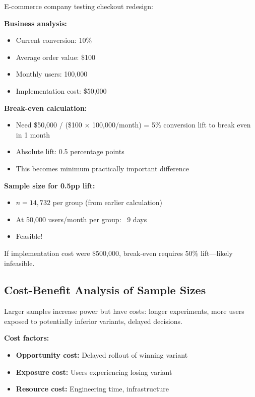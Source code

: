 \begin{example}
E-commerce company testing checkout redesign:

\textbf{Business analysis:}
\begin{itemize}
    \item Current conversion: 10\%
    \item Average order value: \$100
    \item Monthly users: 100,000
    \item Implementation cost: \$50,000
\end{itemize}

\textbf{Break-even calculation:}
\begin{itemize}
    \item Need \$50,000 / (\$100 × 100,000/month) = 5\% conversion lift to break even in 1 month
    \item Absolute lift: 0.5 percentage points
    \item This becomes minimum practically important difference
\end{itemize}

\textbf{Sample size for 0.5pp lift:}
\begin{itemize}
    \item $n = 14,732$ per group (from earlier calculation)
    \item At 50,000 users/month per group: ~9 days
    \item Feasible!
\end{itemize}

If implementation cost were \$500,000, break-even requires 50\% lift—likely infeasible.
\end{example}

\subsection{Cost-Benefit Analysis of Sample Sizes}

Larger samples increase power but have costs: longer experiments, more users exposed to potentially inferior variants, delayed decisions.

\textbf{Cost factors:}
\begin{itemize}
    \item \textbf{Opportunity cost:} Delayed rollout of winning variant
    \item \textbf{Exposure cost:} Users experiencing losing variant
    \item \textbf{Resource cost:} Engineering time, infrastructure
\end{itemize}

